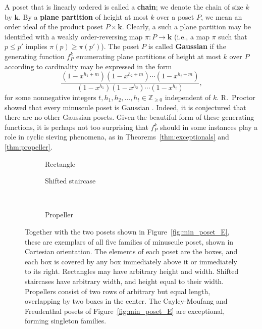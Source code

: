 \documentclass[12pt]{amsart}
\theoremstyle{definition}
\theoremstyle{remark}
\numberwithin{equation}{section}
\begin{document}
A poset that is linearly ordered is called a {\bf chain}; we denote the chain of size $k$ by $\mathbf{k}$. By a {\bf plane partition} of height at most $k$ over a poset $P$, we mean an order ideal of the product poset $P \times \mathbf{k}$.  Clearly, a such a plane partition may be identified with a weakly order-reversing map $\pi : P \to \mathbf{k}$ (i.e., a map $\pi$ such that $p \leq p'$ implies $\pi(p) \geq \pi(p')$). The poset $P$ is called {\bf Gaussian} if the generating function $f_P^k$ enumerating plane partitions of height at most $k$ over $P$ according to cardinality may be expressed in the form
\[
\frac{(1 - x^{h_1 + m})(1 - x^{h_2 + m})\cdots(1 - x^{h_t + m})}{(1 - x^{h_1})(1 - x^{h_2})\cdots(1 - x^{h_t})},
\]
for some nonnegative integers $t, h_1, h_2, \dots, h_t \in \mathbb{Z}_{\geq 0}$ independent of $k$.
R.~Proctor showed that every minuscule poset is Gaussian \cite{Proctor}. Indeed, it is conjectured that there are no other Gaussian posets. Given the beautiful form of these generating functions, it is perhaps not too surprising that $f_P^k$ should in some instances play a role in cyclic sieving phenomena, as in Theorems~\ref{thm:exceptionals} and \ref{thm:propeller}.

\begin{figure}[h]
	\begin{subfigure}[b]{0.27\textwidth}
		\centering
		\caption{Rectangle}
	\end{subfigure}
	\hspace{2cm}
	\begin{subfigure}[b]{0.27\textwidth}
		\centering
		\caption{Shifted staircase}
	\end{subfigure} \\
	\vspace{3mm}
	\begin{subfigure}[b]{0.27\textwidth}
		\centering
		\caption{Propeller}
	\end{subfigure}
\caption{Together with the two posets shown in Figure~\ref{fig:min_poset_E}, these are exemplars of all five families of minuscule poset, shown in Cartesian orientation. The elements of each poset are the boxes, and each box is covered by any box immediately above it or immediately to its right. Rectangles may have arbitrary height and width. Shifted staircases have arbitrary width, and height equal to their width. Propellers consist of two rows of arbitrary but equal length, overlapping by two boxes in the center. The Cayley-Moufang and Freudenthal posets of Figure~\ref{fig:min_poset_E} are exceptional, forming singleton families.}\label{fig:min_poset}
\end{figure}
\end{document}
